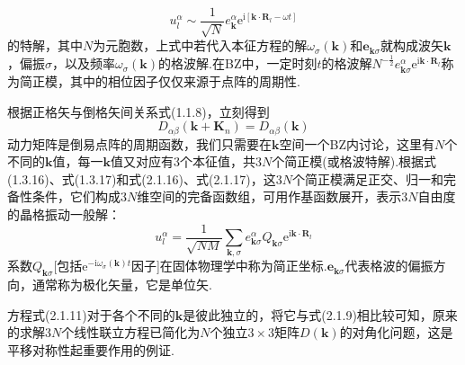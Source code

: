 \begin{equation*}
  u_l^{\alpha}\sim\frac{1}{\sqrt{N}}e_{\boldsymbol{k}}^{\alpha}
  \mathrm{e}^{\mathrm{i}[\boldsymbol{k}\cdot\boldsymbol{R}_l-\omega t]}
\end{equation*}
的特解，其中$N$为元胞数，上式中若代入本征方程的解$\omega_{\sigma}(\boldsymbol{k})$和$\boldsymbol{e}_{\boldsymbol{k}\sigma}$就构成波矢$\boldsymbol{k}$，偏振$\sigma$，以及频率$\omega_{\sigma}(\boldsymbol{k})$的格波解.在BZ中，一定时刻$t$的格波解$N^{-\frac{1}{2}}e_{\boldsymbol{k}\sigma}^{\alpha}\mathrm{e}^{\mathrm{i}\boldsymbol{k}\cdot\boldsymbol{R}_l}$称为简正模，其中的相位因子仅仅来源于点阵的周期性.

根据正格矢与倒格矢间关系式(1.1.8)，立刻得到
\begin{equation}
  D_{\alpha\beta}(\boldsymbol{k}+\boldsymbol{K}_n)=D_{\alpha\beta}(\boldsymbol{k})
\end{equation}
动力矩阵是倒易点阵的周期函数，我们只需要在$\boldsymbol{k}$空间一个BZ内讨论，这里有$N$个不同的$\boldsymbol{k}$值，每一$\boldsymbol{k}$值又对应有3个本征值，共$3N$个简正模(或格波特解).根据式(1.3.16)、式(1.3.17)和式(2.1.16)、式(2.1.17)，这$3N$个简正模满足正交、归一和完备性条件，它们构成$3N$维空间的完备函数组，可用作基函数展开，表示$3N$自由度的晶格振动一般解：
\begin{equation}
  u_l^{\alpha}=\frac{1}{\sqrt{NM}}\sum_{\boldsymbol{k},\sigma}
  e_{\boldsymbol{k}\sigma}^{\alpha}Q_{\boldsymbol{k}\sigma}
  \mathrm{e}^{\mathrm{i}\boldsymbol{k}\cdot\boldsymbol{R}_l}
\end{equation}
系数$Q_{\boldsymbol{k}\sigma}$[包括$\mathrm{e}^{-\mathrm{i}\omega_{\sigma}(\boldsymbol{k})t}$因子]在固体物理学中称为简正坐标.$\boldsymbol{e}_{\boldsymbol{k}\sigma}$代表格波的偏振方向，通常称为极化矢量，它是单位矢.

方程式(2.1.11)对于各个不同的$\boldsymbol{k}$是彼此独立的，将它与式(2.1.9)相比较可知，原来的求解$3N$个线性联立方程已简化为$N$个独立$3\times3$矩阵$D(\boldsymbol{k})$的对角化问题，这是平移对称性起重要作用的例证.

